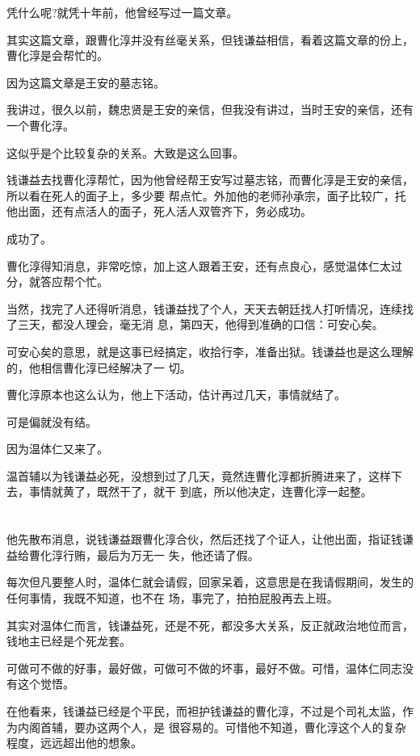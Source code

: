 \documentclass[11pt,a4paper,onecolumn]{article}
\begin{document}
凭什么呢?就凭十年前，他曾经写过一篇文章。

其实这篇文章，跟曹化淳并没有丝毫关系，但钱谦益相信，看着这篇文章的份上，曹化淳是会帮忙的。

因为这篇文章是王安的墓志铭。

我讲过，很久以前，魏忠贤是王安的亲信，但我没有讲过，当时王安的亲信，还有一个曹化淳。

这似乎是个比较复杂的关系。大致是这么回事。

钱谦益去找曹化淳帮忙，因为他曾经帮王安写过墓志铭，而曹化淳是王安的亲信，所以看在死人的面子上，多少要
帮点忙。外加他的老师孙承宗，面子比较广，托他出面，还有点活人的面子，死人活人双管齐下，务必成功。

成功了。

曹化淳得知消息，非常吃惊，加上这人跟着王安，还有点良心，感觉温体仁太过分，就答应帮个忙。

当然，找完了人还得听消息，钱谦益找了个人，天天去朝廷找人打听情况，连续找了三天，都没人理会，毫无消
息，第四天，他得到准确的口信：可安心矣。

可安心矣的意思，就是这事已经搞定，收拾行李，准备出狱。钱谦益也是这么理解的，他相信曹化淳已经解决了一
切。

曹化淳原本也这么认为，他上下活动，估计再过几天，事情就结了。

可是偏就没有结。

因为温体仁又来了。

温首辅以为钱谦益必死，没想到过了几天，竟然连曹化淳都折腾进来了，这样下去，事情就黄了，既然干了，就干
到底，所以他决定，连曹化淳一起整。

\section[\thesection]{}

他先散布消息，说钱谦益跟曹化淳合伙，然后还找了个证人，让他出面，指证钱谦益给曹化淳行贿，最后为万无一
失，他还请了假。

每次但凡要整人时，温体仁就会请假，回家呆着，这意思是在我请假期间，发生的任何事情，我既不知道，也不在
场，事完了，拍拍屁股再去上班。

其实对温体仁而言，钱谦益死，还是不死，都没多大关系，反正就政治地位而言，钱地主已经是个死龙套。

可做可不做的好事，最好做，可做可不做的坏事，最好不做。可惜，温体仁同志没有这个觉悟。

在他看来，钱谦益已经是个平民，而袒护钱谦益的曹化淳，不过是个司礼太监，作为内阁首辅，要办这两个人，是
很容易的。可惜他不知道，曹化淳这个人的复杂程度，远远超出他的想象。
\end{document}
